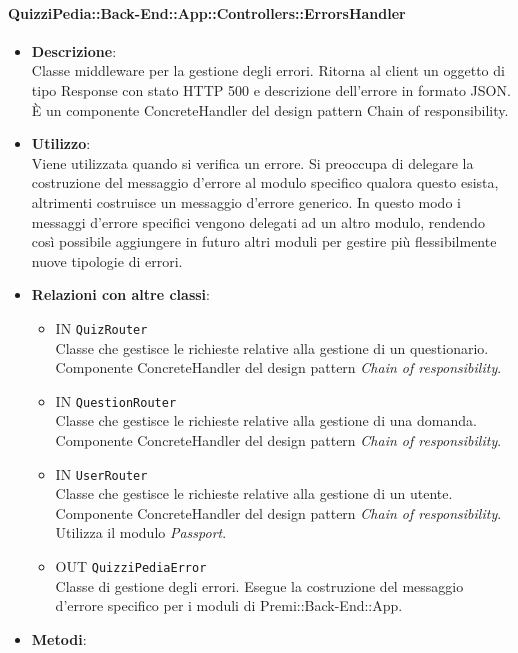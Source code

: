 \paragraph{QuizziPedia::Back-End::App::Controllers::ErrorsHandler}
\begin{itemize}
	\item \textbf{Descrizione}:\\
	Classe middleware per la gestione degli errori. Ritorna al client un oggetto di tipo Response con stato HTTP 500 e descrizione dell’errore in formato JSON. È un componente ConcreteHandler del design pattern Chain of responsibility.
	\item \textbf{Utilizzo}:\\
	Viene utilizzata quando si verifica un errore. Si preoccupa di delegare la costruzione del messaggio d’errore al modulo specifico qualora questo esista, altrimenti costruisce un messaggio d’errore generico. In questo modo i messaggi d’errore specifici vengono delegati ad un altro modulo, rendendo così possibile aggiungere in futuro altri moduli per gestire più flessibilmente nuove tipologie di errori.
	\item \textbf{Relazioni con altre classi}:\\
	\begin{itemize}
		\item IN \texttt{QuizRouter}\\
		Classe che gestisce le richieste relative alla gestione di un questionario. Componente ConcreteHandler del design pattern \textit{Chain of responsibility}.
		\item IN \texttt{QuestionRouter}\\
		Classe che gestisce le richieste relative alla gestione di una domanda. Componente ConcreteHandler del design pattern \textit{Chain of responsibility}.
		\item IN \texttt{UserRouter}\\
		Classe che gestisce le richieste relative alla gestione di un utente. Componente ConcreteHandler del design pattern \textit{Chain of responsibility}. Utilizza il modulo \textit{Passport}.
		\item OUT \texttt{QuizziPediaError}\\
		Classe di gestione degli errori. Esegue la costruzione del messaggio d’errore specifico per i moduli di Premi::Back-End::App.
	\end{itemize}
	\item \textbf{Metodi}:\\

\end{itemize}
